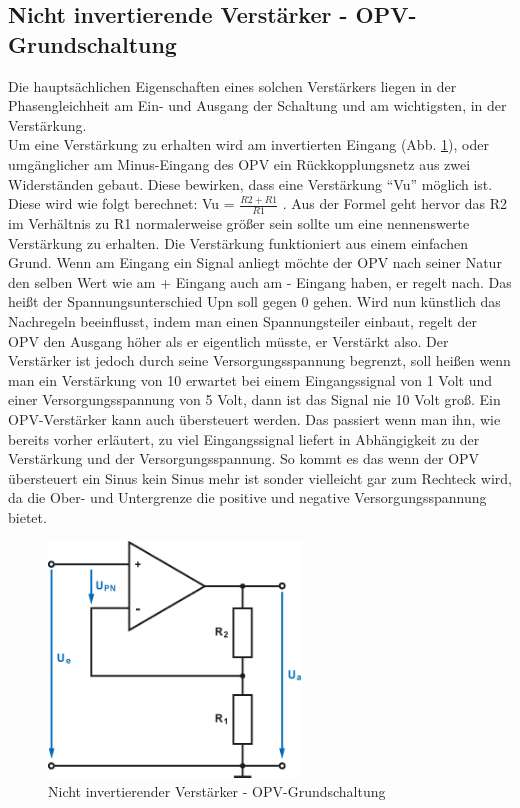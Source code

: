 \subsection{Nicht invertierende Verstärker - OPV-Grundschaltung}\label{sec:8.5}
Die hauptsächlichen Eigenschaften eines solchen Verstärkers liegen in der Phasengleichheit am Ein- und Ausgang der Schaltung und am wichtigsten, in der Verstärkung. \\
Um eine Verstärkung zu erhalten wird am invertierten Eingang (Abb. \ref{fig:8.5.1}), oder umgänglicher am Minus-Eingang des OPV ein Rückkopplungsnetz aus zwei Widerständen gebaut.
Diese bewirken, dass eine Verstärkung \enquote{Vu} möglich ist.
Diese wird wie folgt berechnet: Vu = $\frac{R2+R1}{R1}$ .
Aus der Formel geht hervor das R2 im Verhältnis zu R1 normalerweise größer sein sollte um eine nennenswerte Verstärkung zu erhalten.
Die Verstärkung funktioniert aus einem einfachen Grund.
Wenn am Eingang ein Signal anliegt möchte der OPV nach seiner Natur den selben Wert wie am + Eingang auch am - Eingang haben, er regelt nach.
Das heißt der Spannungsunterschied Upn soll gegen 0 gehen.
Wird nun künstlich das Nachregeln beeinflusst, indem man einen Spannungsteiler einbaut, regelt der OPV den Ausgang höher als er eigentlich müsste, er Verstärkt also.
Der Verstärker ist jedoch durch seine Versorgungsspannung begrenzt, soll heißen wenn man ein Verstärkung von 10 erwartet bei einem Eingangssignal von 1 Volt und einer Versorgungsspannung von 5 Volt, dann ist das Signal nie 10 Volt groß.
Ein OPV-Verstärker kann auch übersteuert werden.
Das passiert wenn man ihn, wie bereits vorher erläutert, zu viel Eingangssignal liefert in Abhängigkeit zu der Verstärkung und der Versorgungsspannung.
So kommt es das wenn der OPV übersteuert ein Sinus kein Sinus mehr ist sonder vielleicht gar zum Rechteck wird, da die Ober- und Untergrenze die positive und negative Versorgungsspannung bietet.
\begin{figure} [H]
	\centering	
	\includegraphics[width=0.6\textwidth]{img/Grundlagen/OPV-Verstaerker/OPV-VerstaerkerGrundschaltung.png}
	\caption[Nicht invertierender Verstärker - OPV-Grundschaltung]{Nicht invertierender Verstärker - OPV-Grundschaltung\footnotemark}
	\label {fig:8.5.1}
\end{figure}

